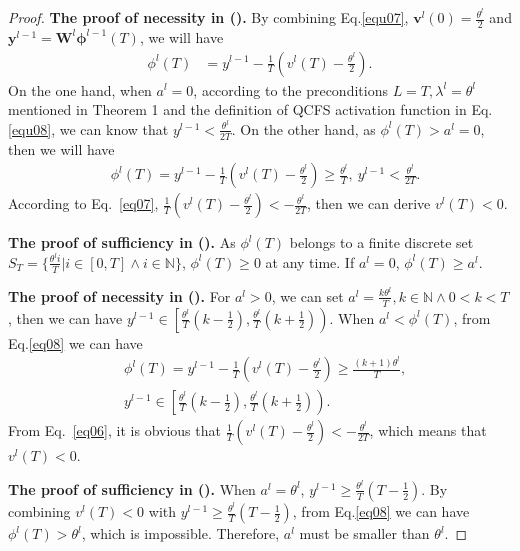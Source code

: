 \documentclass[letterpaper]{article} %
\begin{document}
\begin{proof}

\textbf{The proof of necessity in ().} By combining Eq.\eqref{equ07}, $\boldsymbol{v}^l(0)=\frac{{\theta}^l}{2}$ and $\boldsymbol{y}^{l-1}=\boldsymbol{W}^l\boldsymbol{\phi}^{l-1}(T)$, we will have
\begin{align}
    \phi^l(T) &= {y}^{l-1} - \frac{1}{T}\left({v}^l(T)-\frac{{\theta}^l}{2}\right). \label{eq08}
\end{align}
On the one hand, when ${a}^l=0$, according to the preconditions $L=T,\lambda^l={\theta}^l$ mentioned in Theorem 1 and the definition of QCFS activation function in Eq.\eqref{equ08}, we can know that ${y}^{l-1}<\frac{{\theta}^l}{2T}$. On the other hand, as $\phi^l(T)>{a}^l=0$, then we will have 
\begin{align}
    &\phi^l(T)= {y}^{l-1} - \frac{1}{T}\left({v}^l(T)-\frac{{\theta}^l}{2}\right) \geqslant \frac{{\theta}^l}{T},\  {y}^{l-1}<\frac{{\theta}^l}{2T}. \label{eq07}
\end{align}
According to Eq.~\eqref{eq07}, $\frac{1}{T}({v}^l(T)-\frac{{\theta}^l}{2})<-\frac{{\theta}^l}{2T}$, then we can derive ${v}^l(T)<0$.


\textbf{The proof of sufficiency in ().} As ${\phi}^l(T)$ belongs to a finite discrete set $S_T = \{ \frac{{\theta}^l i}{T} | i\in [0,T] \wedge  i\in \mathbb{N} \}$, ${\phi}^l(T)\geqslant 0$ at any time. If ${a}^l=0$, $\phi^l(T) \geqslant{a}^l$.


\textbf{The proof of necessity in ().} For ${a}^l>0$, we can set ${a}^l=\frac{k{\theta}^l}{T},k\in\mathbb{N}\wedge 0<k<T$, then we can have $y^{l-1}\in \left[\frac{{\theta}^l}{T}(k-\frac{1}{2}),\frac{{\theta}^l}{T}(k+\frac{1}{2})\right)$. When ${a}^l<\phi^l(T)$, from Eq.\eqref{eq08} we can have 
\begin{align}
    &\phi^l(T)= {y}^{l-1} - \frac{1}{T}\left({v}^l(T)-\frac{{\theta}^l}{2}\right) \geqslant \frac{(k+1){\theta}^l}{T}, \nonumber \\
    &y^{l-1}\in \left[\frac{{\theta}^l}{T}(k-\frac{1}{2}),\frac{{\theta}^l}{T}(k+\frac{1}{2})\right). \label{eq06}
\end{align}
From Eq.~\eqref{eq06}, it is obvious that $\frac{1}{T}({v}^l(T)-\frac{{\theta}^l}{2})<-\frac{{\theta}^l}{2T}$, which means that ${v}^l(T)<0$.


\textbf{The proof of sufficiency in ().} When $a^l=\theta^l$, $y^{l-1}\geqslant\frac{{\theta}^l}{T}(T-\frac{1}{2})$. By combining ${v}^l(T)<0$ with $y^{l-1}\geqslant\frac{{\theta}^l}{T}(T-\frac{1}{2})$, from Eq.\eqref{eq08} we can have $\phi^l(T)>\theta^l$, which is impossible. Therefore, $a^l$ must be smaller than $\theta^l$.



\end{proof}
\end{document}
